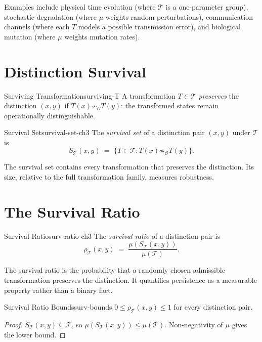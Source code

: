\documentclass[12pt,twoside,openright]{book}
\newcommand{\transfam}{\mathcal{T}}       %
\newcommand{\obs}{\mathcal{O}}
\newcommand{\survRatio}{\rho}             %
\providecommand{\survivalSet}[1]{S_{\transfam}(#1)}
\begin{document}
Examples include physical time evolution (where $\transfam$ is
a one-parameter group), stochastic degradation (where $\mu$
weights random perturbations), communication channels (where
each $T$ models a possible transmission error), and biological
mutation (where $\mu$ weights mutation rates).

\section{Distinction Survival}

\begin{definition}{Surviving Transformation}{surviving-T}
A transformation $T\in\transfam$ \emph{preserves} the
distinction $(x,y)$ if $T(x)\not\sim_\obs T(y)$: the
transformed states remain operationally distinguishable.
\end{definition}

\begin{definition}{Survival Set}{survival-set-ch3}
The \emph{survival set} of a distinction pair $(x,y)$ under
$\transfam$ is
\[
  \survivalSet{x,y}
  \;=\;
  \{T\in\transfam : T(x)\not\sim_\obs T(y)\}.
\]
\end{definition}

The survival set contains every transformation that preserves
the distinction. Its size, relative to the full transformation
family, measures robustness.

\section{The Survival Ratio}

\begin{definition}{Survival Ratio}{surv-ratio-ch3}
The \emph{survival ratio} of a distinction pair is
\[
  \survRatio_\transfam(x,y)
  \;=\;
  \frac{\mu(\survivalSet{x,y})}{\mu(\transfam)}.
\]
\end{definition}

The survival ratio is the probability that a randomly chosen
admissible transformation preserves the distinction. It
quantifies persistence as a measurable property rather than a
binary fact.

\begin{theorem}{Survival Ratio Bounds}{surv-bounds}
$0\le\survRatio_\transfam(x,y)\le 1$ for every distinction pair.
\begin{proof}
$\survivalSet{x,y}\subseteq\transfam$, so
$\mu(\survivalSet{x,y})\le\mu(\transfam)$. Non-negativity
of $\mu$ gives the lower bound.
\end{proof}
\end{theorem}
\end{document}
